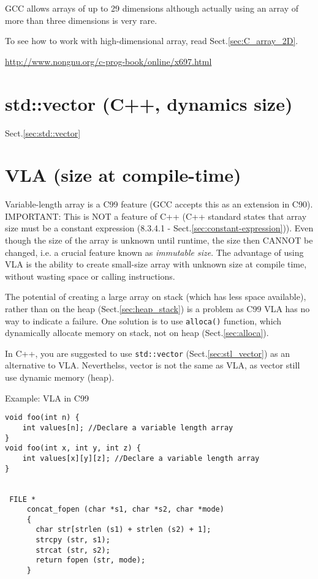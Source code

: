 GCC allows arrays of up to 29 dimensions although actually using an array of
more than three dimensions is very rare.

To see how to work with high-dimensional array, read Sect.\ref{sec:C_array_2D}.

\url{http://www.nongnu.org/c-prog-book/online/x697.html}


\section{std::vector (C++, dynamics size)}

Sect.\ref{sec:std::vector}


\section{VLA (size at compile-time)}
\label{sec:VLA}

Variable-length array is a C99 feature (GCC accepts this as an extension in
C90). IMPORTANT: This is NOT a feature of C++ (C++ standard states that array
size must be a constant expression (8.3.4.1 -
Sect.\ref{sec:constant-expression})). Even though the size of the array is
unknown until runtime, the size then CANNOT be changed, i.e. a crucial feature
known as {\it immutable size}. The advantage of using VLA is the ability to
create small-size array with unknown size at compile time, without wasting space
or calling instructions.

The potential of creating a large array on stack (which has less space
available), rather than on the heap (Sect.\ref{sec:heap_stack}) is a problem as
C99 VLA has no way to indicate a failure. One solution is to use \verb!alloca()!
function, which dynamically allocate memory on stack, not on heap
(Sect.\ref{sec:alloca}).

In C++, you are suggested to use \verb!std::vector! (Sect.\ref{sec:stl_vector})
as an alternative to VLA. Neverthelss, vector is not the same as VLA, as
vector still use dynamic memory (heap). 

Example: VLA in C99
\begin{verbatim}
void foo(int n) {
    int values[n]; //Declare a variable length array
}
void foo(int x, int y, int z) {
    int values[x][y][z]; //Declare a variable length array
}


 FILE *
     concat_fopen (char *s1, char *s2, char *mode)
     {
       char str[strlen (s1) + strlen (s2) + 1];
       strcpy (str, s1);
       strcat (str, s2);
       return fopen (str, mode);
     }
\end{verbatim}

